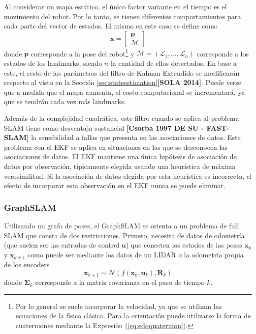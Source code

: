 Al considerar un mapa estático, el único factor variante en el tiempo es el movimiento del robot. Por lo tanto, se tienen diferentes comportamientos para cada parte del vector de estados. El mismo en este caso se define como
\begin{equation}
    \bm{x} = 
    \begin{bmatrix}
        \bm{p} \\
        \bm{\mathcal{M}}
    \end{bmatrix}
\end{equation}
donde $\bm{p}$ corresponde a la pose del robot\footnote{Por lo general se suele incorporar la velocidad, ya que se utilizan las ecuaciones de la física clásica. Para la orientación puede utilizarse la forma de cuaterniones mediante la Expresión (\ref{eq:edoquaternion}).} y $\bm{\mathcal{M}}=(\mathcal{L}_1,...,\mathcal{L}_n)$ corresponde a los estados de los landmarks, siendo $n$ la cantidad de ellos detectados. En base a este, el resto de los parámetros del filtro de Kalman Extendido se modificarán respecto al visto en la Sección \ref{sec:stateestimation}\textbf{[SOLA 2014]}. Puede verse que a medida que el mapa aumenta, el costo computacional se incrementará, ya que se tendrán cada vez más landmarks.

Además de la complejidad cuadrática, este filtro cuando se aplica al problema SLAM tiene como desventaja sustancial \textbf{[Csorba 1997 DE SU - FAST-SLAM]}
la sensibilidad a fallas que presenta en las asociaciones de datos. Este problema con el EKF se aplica en situaciones en las que se desconocen las asociaciones de datos. El EKF mantiene una única hipótesis de asociación de datos por observación, típicamente elegida usando una heurística de máxima verosimilitud. Si la asociación de datos elegida por esta heurística es incorrecta, el efecto de incorporar esta observación en el EKF nunca se puede eliminar.



\subsubsection{GraphSLAM}
Utilizando un grafo de poses, el GraphSLAM se orienta a un problema de full SLAM que consta de dos restricciones. Primero, necesita de datos de odometría (que suelen ser las entradas de control $\bm{u}$) que conecten los estados de las poses $\bm{x}_k$ y $\bm{x}_{k+1}$ como puede ser mediante los datos de un LIDAR o la odometría propia de los encoders
\begin{equation}
    \bm{x}_{k+1} \sim \mathcal{N}(f(\bm{x}_{k},\bm{u}_k),\bm{R}_k)
\end{equation}
donde $\bm{\Sigma}_k$ corresponde a la matriz covarianza en el paso de tiempo $k$.

